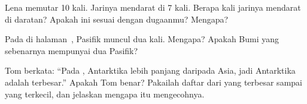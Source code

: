 \begin{exercise}[$\star\star$]\label{exo:g3:continents-and-oceans:8}
Lena memutar  10 kali. Jarinya mendarat di  7 kali. Berapa
kali jarinya mendarat di daratan? Apakah ini sesuai dengan dugaanmu?
Mengapa?
\end{exercise}

\begin{exercise}[$\star\star$]\label{exo:g3:continents-and-oceans:9}
Pada  di halaman~\pageref{fig:g3:continents-and-oceans:world-map},
 Pasifik muncul dua kali. Mengapa? Apakah Bumi yang sebenarnya
mempunyai dua  Pasifik?
\end{exercise}

\begin{exercise}[$\star\star\star$]\label{exo:g3:continents-and-oceans:10}
Tom berkata: ``Pada , Antarktika lebih panjang daripada Asia,
jadi Antarktika adalah  terbesar.'' Apakah Tom benar? Pakailah daftar
 dari yang terbesar sampai yang terkecil, dan jelaskan mengapa  itu mengecohnya.
\end{exercise}
